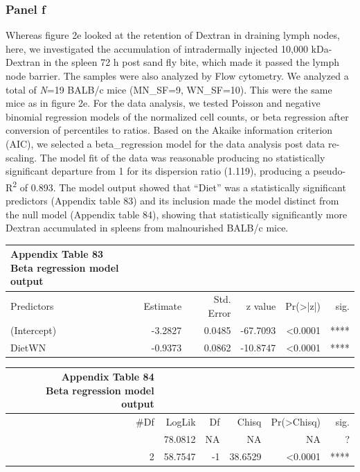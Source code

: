 \documentclass[
  12pt,
  letterpaper,
]{article}
\begin{document}
\subsubsection{Panel f}\label{panel-f}

Whereas figure 2e looked at the retention of Dextran in draining lymph nodes, here, we investigated the accumulation of intradermally injected 10,000 kDa-Dextran in the spleen 72 h post sand fly bite, which made it passed the lymph node barrier. The samples were also analyzed by Flow cytometry. We analyzed a total of \emph{N}=19 BALB/c mice (MN\_SF=9, WN\_SF=10). This were the same mice as in figure 2e. For the data analysis, we tested Poisson and negative binomial regression models of the normalized cell counts, or beta regression after conversion of percentiles to ratios. Based on the Akaike information criterion (AIC), we selected a beta\_regression model for the data analysis post data re-scaling. The model fit of the data was reasonable producing no statistically significant departure from 1 for its dispersion ratio (1.119), producing a pseudo-R\textsuperscript{2} of 0.893. The model output showed that ``Diet'' was a statistically significant predictors (Appendix table 83) and its inclusion made the model distinct from the null model (Appendix table 84), showing that statistically significantly more Dextran accumulated in spleens from malnourished BALB/c mice.

\begin{longtable}{l|rrrrr}
\caption*{
{\large \textbf{Appendix Table 83}} \\ 
{\small \textbf{Beta regression model output}}
} \\ 
\toprule
\multicolumn{1}{l}{Predictors} & Estimate & Std. Error & z value & Pr(>|z|) & sig. \\ 
\midrule\addlinespace[2.5pt]
(Intercept) & -3.2827 & 0.0485 & -67.7093 & <0.0001 & **** \\ 
DietWN & -0.9373 & 0.0862 & -10.8747 & <0.0001 & **** \\ 
\bottomrule
\end{longtable}

\begin{longtable}{rrrrrr}
\caption*{
{\large \textbf{Appendix Table 84}} \\ 
{\small \textbf{Beta regression model output}}
} \\ 
\toprule
\#Df & LogLik & Df & Chisq & Pr(>Chisq) & sig. \\ 
\midrule\addlinespace[2.5pt]
3 & 78.0812 & NA & NA & NA & ? \\ 
2 & 58.7547 & -1 & 38.6529 & <0.0001 & **** \\ 
\bottomrule
\end{longtable}
\end{document}
